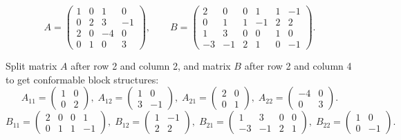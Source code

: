 \documentclass[12pt,a3paper]{article}
\begin{document}
\begin{tcolorbox}[enhanced,breakable,
  colback=cA!4,colframe=cA,boxrule=0.8pt,arc=5pt,
  title={\textbf{Answer --- Conformal Partitioning: $4\times4$ Times $4\times6$}},
  fonttitle=\bfseries\color{white},colbacktitle=cA]

\[
  A = \begin{pmatrix} 1 & 0 & 1 & 0 \\ 0 & 2 & 3 & -1 \\ 2 & 0 & -4 & 0 \\ 0 & 1 & 0 & 3 \end{pmatrix}, \qquad
  B = \begin{pmatrix} 2 & 0 & 0 & 1 & 1 & -1 \\ 0 & 1 & 1 & -1 & 2 & 2 \\ 1 & 3 & 0 & 0 & 1 & 0 \\ -3 & -1 & 2 & 1 & 0 & -1 \end{pmatrix}.
\]

Split matrix $A$ after row 2 and column 2, and matrix $B$ after row 2 and column 4 to get conformable block structures:
\[
  A_{11}=\begin{pmatrix}1&0\\0&2\end{pmatrix},\;
  A_{12}=\begin{pmatrix}1&0\\3&-1\end{pmatrix},\;
  A_{21}=\begin{pmatrix}2&0\\0&1\end{pmatrix},\;
  A_{22}=\begin{pmatrix}-4&0\\0&3\end{pmatrix}.
\]
\[
  B_{11}=\begin{pmatrix}2&0&0&1\\0&1&1&-1\end{pmatrix},\;
  B_{12}=\begin{pmatrix}1&-1\\2&2\end{pmatrix},\;
  B_{21}=\begin{pmatrix}1&3&0&0\\-3&-1&2&1\end{pmatrix},\;
  B_{22}=\begin{pmatrix}1&0\\0&-1\end{pmatrix}.
\]


\end{tcolorbox}
\end{document}
